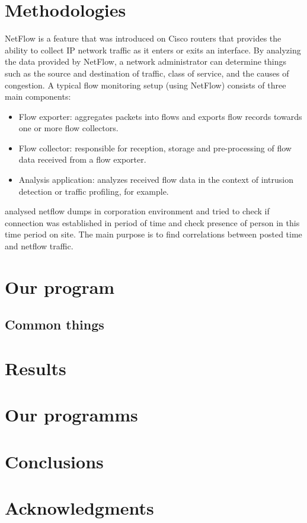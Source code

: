 \documentclass[12pt,a4paper]{report}
\begin{document}
\chapter{Methodologies}
NetFlow is a feature that was introduced on Cisco routers that provides the ability to collect IP network traffic as it enters or exits an interface. By analyzing the data provided by NetFlow, a network administrator can determine things such as the source and destination of traffic, class of service, and the causes of congestion. A typical flow monitoring setup (using NetFlow) consists of three main components:\cite{methodologies1}
\begin{itemize}
	\item{Flow exporter: aggregates packets into flows and exports flow records towards one or more flow collectors.}
	\item{Flow collector: responsible for reception, storage and pre-processing of flow data received from a flow exporter.}
	\item{Analysis application: analyzes received flow data in the context of intrusion detection or traffic profiling, for example.}
\end{itemize}

analysed netflow dumps in corporation environment and tried to check if connection was established in period of time and check presence of person in this time period on site. The main purpose is to find correlations between posted time and netflow traffic.


\chapter{Our program}
\section{Common things}




\chapter{Results}
\chapter{Our programms}
\chapter{Conclusions}
\chapter{Acknowledgments}

\end{document}

